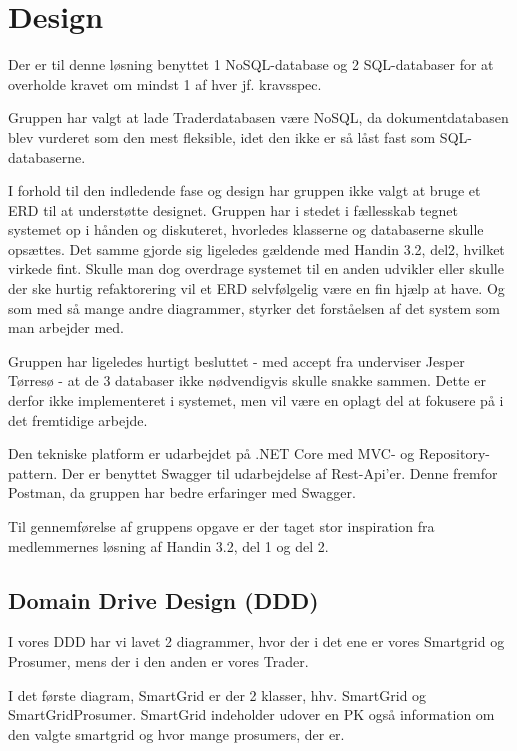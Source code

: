 
\section{Design}

Der er til denne løsning benyttet 1 NoSQL-database og 2 SQL-databaser for at overholde kravet om mindst 1 af hver jf. kravsspec.

Gruppen har valgt at lade Traderdatabasen være NoSQL, da dokumentdatabasen blev vurderet som den mest fleksible, idet den ikke er så låst fast som SQL-databaserne.

I forhold til den indledende fase og design har gruppen ikke valgt at bruge et ERD til at understøtte designet. Gruppen har i stedet i fællesskab tegnet systemet op i hånden og diskuteret, hvorledes klasserne og databaserne skulle opsættes. Det samme gjorde sig ligeledes gældende med Handin 3.2, del2, hvilket virkede fint.
Skulle man dog overdrage systemet til en anden udvikler eller skulle der ske hurtig refaktorering vil et ERD selvfølgelig være en fin hjælp at have. Og som med så mange andre diagrammer, styrker det forståelsen af det system som man arbejder med.

Gruppen har ligeledes hurtigt besluttet - med accept fra underviser Jesper Tørresø - at de 3 databaser ikke nødvendigvis skulle snakke sammen.
Dette er derfor ikke implementeret i systemet, men vil være en oplagt del at fokusere på i det fremtidige arbejde.

Den tekniske platform er udarbejdet på .NET Core med MVC- og Repository-pattern.
Der er benyttet Swagger til udarbejdelse af Rest-Api'er. Denne fremfor Postman, da gruppen har bedre erfaringer med Swagger.

Til gennemførelse af gruppens opgave er der taget stor inspiration fra medlemmernes løsning af Handin 3.2, del 1 og del 2.

\subsection{Domain Drive Design (DDD)}

I vores DDD har vi lavet 2 diagrammer, hvor der i det ene er vores Smartgrid og Prosumer, mens der i  den anden er vores Trader.

I det første diagram, SmartGrid er der 2 klasser, hhv. SmartGrid og SmartGridProsumer. SmartGrid indeholder udover en PK også information om den valgte smartgrid og hvor mange prosumers, der er.

